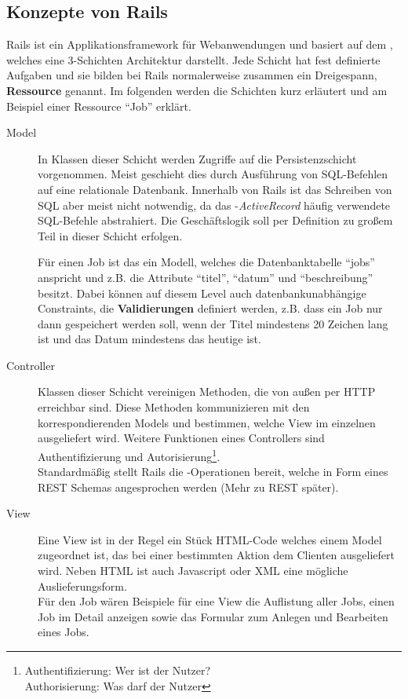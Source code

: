 \subsection{Konzepte von Rails}
\label{sec:railsconcepts}
Rails ist ein Applikationsframework für Webanwendungen und basiert auf dem  , welches eine 3-Schichten Architektur darstellt. Jede Schicht hat fest definierte Aufgaben und sie bilden bei Rails normalerweise zusammen ein Dreigespann, \textbf{Ressource} genannt. Im folgenden werden die Schichten kurz erläutert und am Beispiel einer Ressource "`Job"' erklärt.
\begin{description}
 \item[Model] In Klassen dieser Schicht werden Zugriffe auf die Persistenzschicht vorgenommen. Meist geschieht dies durch Ausführung von SQL-Befehlen auf eine relationale Datenbank. Innerhalb von Rails ist das Schreiben von SQL aber meist nicht notwendig, da das -\textit{ActiveRecord} häufig verwendete SQL-Befehle abstrahiert. Die Geschäftslogik soll per Definition zu großem Teil in dieser Schicht erfolgen.

 Für einen Job ist das ein Modell, welches die Datenbanktabelle "`jobs"' anspricht und z.B. die Attribute "`titel"', "`datum"' und "`beschreibung"' besitzt. Dabei können auf diesem Level auch datenbankunabhängige Constraints, die \textbf{Validierungen} definiert werden, z.B. dass ein Job nur dann gespeichert werden soll, wenn der Titel mindestens 20 Zeichen lang ist und das Datum mindestens das heutige ist.
 \item[Controller] Klassen dieser Schicht vereinigen Methoden, die von außen per HTTP erreichbar sind. Diese Methoden kommunizieren mit den korrespondierenden Models und bestimmen, welche View im einzelnen ausgeliefert wird. Weitere Funktionen eines Controllers sind Authentifizierung und Autorisierung\footnote{Authentifizierung: Wer ist der Nutzer?\\Authorisierung: Was darf der Nutzer}.\\
 Standardmäßig stellt Rails die -Operationen bereit, welche in Form eines REST Schemas angesprochen werden (Mehr zu REST später).
 \item[View] Eine View ist in der Regel ein Stück HTML-Code welches einem Model zugeordnet ist, das bei einer bestimmten Aktion dem Clienten ausgeliefert wird. Neben HTML ist auch Javascript oder XML eine mögliche Auslieferungsform.\\
 Für den Job wären Beispiele für eine View die Auflistung aller Jobs, einen Job im Detail anzeigen sowie das Formular zum Anlegen und Bearbeiten eines Jobs.
 \end{description}
